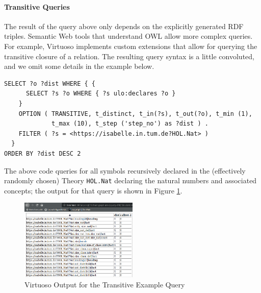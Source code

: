 

\paragraph{Transitive Queries} The result of the query above only depends on the explicitly generated RDF triples. Semantic Web tools that understand OWL allow more complex queries. %
For example, Virtuoso implements custom extensions that allow for querying the transitive closure of a relation. The resulting query syntax is a little convoluted, and we omit some details in the example below.
\begin{lstlisting}
SELECT ?o ?dist WHERE { {
      SELECT ?s ?o WHERE { ?s ulo:declares ?o }
    }
    OPTION ( TRANSITIVE, t_distinct, t_in(?s), t_out(?o), t_min (1),
             t_max (10), t_step ('step_no') as ?dist ) .
    FILTER ( ?s = <https://isabelle.in.tum.de?HOL.Nat> )
  }
ORDER BY ?dist DESC 2
\end{lstlisting}
The above code queries for all symbols recursively declared in the (effectively randomly chosen) Theory \texttt{HOL.Nat} declaring the natural numbers and associated concepts; the output for that query is shown in Figure \ref{fig:query2}.


\begin{figure}[ht]\centering
\includegraphics[width=0.5\textwidth]{ulo_queryresult2}
\caption{Virtuoso Output for the Transitive Example Query}\label{fig:query2}
\end{figure}


